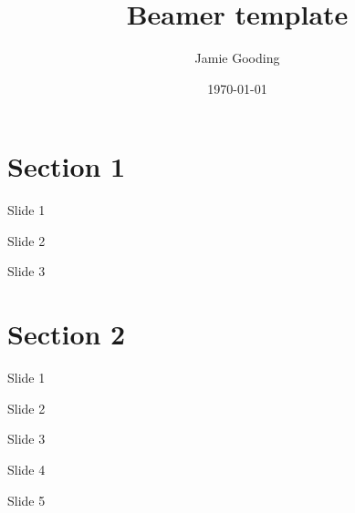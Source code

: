 \documentclass[12 pt, aspectratio=1610]{beamer}
\title{Beamer template}%
\author{Jamie Gooding}
\date{ \today}
\institute{Fakultät Physik,\newline
            Technische Universit{\"a}t Dortmund}
\begin{document}
\begin{frame}
    \maketitle
\end{frame}

\section{Section 1}

\begin{frame}{Slide 1}
    
\end{frame}

\begin{frame}{Slide 2}
    
\end{frame}

\begin{frame}{Slide 3}
    
\end{frame}

\section{Section 2}

\begin{frame}{Slide 1}
    
\end{frame}

\begin{frame}{Slide 2}
    
\end{frame}

\begin{frame}{Slide 3}
    
\end{frame}

\begin{frame}{Slide 4}
    
\end{frame}

\begin{frame}{Slide 5}
    
\end{frame}
\end{document}
